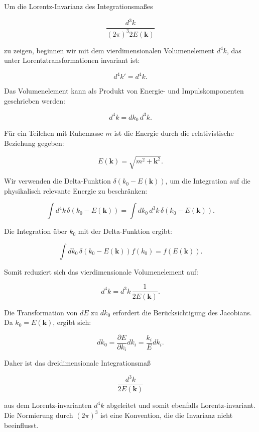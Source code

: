Um die Lorentz-Invarianz des Integrationsmaßes 

\[
\frac{d^3 k}{(2 \pi)^3 2 E(\mathbf{k})}
\]

zu zeigen, beginnen wir mit dem vierdimensionalen Volumenelement \(d^4 k\), das unter Lorentztransformationen invariant ist:

\[
d^4 k' = d^4 k.
\]

Das Volumenelement kann als Produkt von Energie- und Impulskomponenten geschrieben werden:

\[
d^4 k = dk_0 \, d^3 k.
\]

Für ein Teilchen mit Ruhemasse \(m\) ist die Energie durch die relativistische Beziehung gegeben:

\[
E(\mathbf{k}) = \sqrt{m^2 + \mathbf{k}^2}.
\]

Wir verwenden die Delta-Funktion \(\delta(k_0 - E(\mathbf{k}))\), um die Integration auf die physikalisch relevante Energie zu beschränken:

\[
\int d^4 k \, \delta(k_0 - E(\mathbf{k})) = \int dk_0 \, d^3 k \, \delta(k_0 - E(\mathbf{k})).
\]

Die Integration über \(k_0\) mit der Delta-Funktion ergibt:

\[
\int dk_0 \, \delta(k_0 - E(\mathbf{k})) f(k_0) = f(E(\mathbf{k})).
\]

Somit reduziert sich das vierdimensionale Volumenelement auf:

\[
d^4 k = d^3 k \, \frac{1}{2 E(\mathbf{k})}.
\]

Die Transformation von \(dE\) zu \(dk_0\) erfordert die Berücksichtigung des Jacobians. Da \(k_0 = E(\mathbf{k})\), ergibt sich:

\[
dk_0 = \frac{\partial E}{\partial k_i} dk_i = \frac{k_i}{E} dk_i.
\]

Daher ist das dreidimensionale Integrationsmaß

\[
\frac{d^3 k}{2 E(\mathbf{k})}
\]

aus dem Lorentz-invarianten \(d^4 k\) abgeleitet und somit ebenfalls Lorentz-invariant. Die Normierung durch \((2 \pi)^3\) ist eine Konvention, die die Invarianz nicht beeinflusst.

